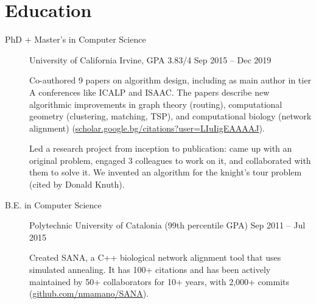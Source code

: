 \documentclass[letterpaper,10pt,oneside]{article}
\begin{document}
\section*{Education}
\begin{description}
\item[PhD + Master's in Computer Science]\quad University of California Irvine, GPA 3.83/4 \hfill Sep 2015 -- Dec 2019

\noindent\llap{\textbullet\hspace{6pt}}Co-authored 9 papers on algorithm design, including as main author in tier A conferences like ICALP and ISAAC. The papers describe new algorithmic improvements in graph theory (routing), computational geometry (clustering, matching, TSP), and computational biology (network alignment) (\href{https://scholar.google.bg/citations?hl=en&user=LIuIigEAAAAJ}{scholar.google.bg/citations?user=LIuIigEAAAAJ}).

\vspace{2px}
\noindent\llap{\textbullet\hspace{6pt}}Led a research project from inception to publication: came up with an original problem, engaged 3 colleagues to work on it, and collaborated with them to solve it. We invented an algorithm for the knight's tour problem (cited by Donald Knuth).

\item[B.E. in Computer Science]\quad Polytechnic University of Catalonia (99th percentile GPA) \hfill Sep 2011 -- Jul 2015

\noindent\llap{\textbullet\hspace{6pt}}Created SANA, a C++ biological network alignment tool that uses simulated annealing. It has 100+ citations and has been actively maintained by 50+ collaborators for 10+ years, with 2,000+ commits (\href{https://github.com/nmamano/SANA}{github.com/nmamano/SANA}).
\end{description}
\end{document}
